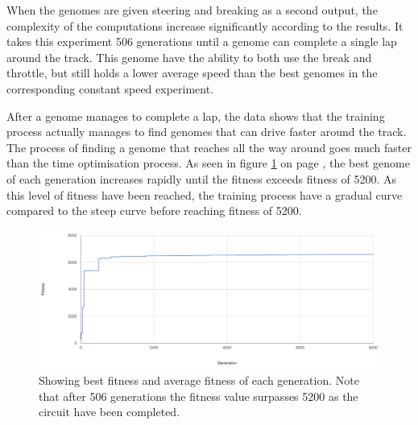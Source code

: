     


When the genomes are given steering and breaking as a second output, the complexity of the computations increase significantly according to the results. It takes this experiment 506 generations until a genome can complete a single lap around the track. This genome have the ability to both use the break and throttle, but still holds a lower average speed than the best genomes in the corresponding constant speed experiment.

After a genome manages to complete a lap, the data shows that the training process actually manages to find genomes that can drive faster around the track. The process of finding a genome that reaches all the way around goes much faster than the time optimisation process. As seen in figure \ref{fig:steerspeeddata} on page \pageref{fig:steerspeeddata}, the best genome of each generation increases rapidly until the fitness exceeds fitness of 5200. As this level of fitness have been reached, the training process have a gradual curve compared to the steep curve before reaching fitness of 5200. 


\begin{figure}[h]
\includegraphics[width=\textwidth]{report/images/graphs/steeringandspeedcontrolrun1}
\centering
\caption{Showing best fitness and average fitness of each generation. Note that after 506 generations the fitness value surpasses 5200 as the circuit have been completed.}
\label{fig:steerspeeddata}
\end{figure}

